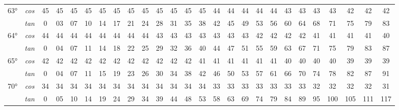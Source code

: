 \begin{tiny}
\begin{longtable}{c c |c |c |c |c |c |c |c |c |c |c |c |c |c |c |c |c |c |c |c |c |c |c |c |c}
		\multirow{2}{*}{63°}&\textit{cos}& 45& 45& 45& 45& 45& 45& 45& 45& 45& 45& 45& 45& 44& 44& 44& 44& 44& 43& 43& 43& 43& 42& 42& 42\\* \space&\textit{tan} & 0 & 03 & 07& 10& 14& 17& 21& 24& 28& 31& 35& 38& 42& 45& 49& 53& 56& 60& 64& 68& 71& 75& 79& 83\\\hline
		\multirow{2}{*}{64°}&\textit{cos}& 44& 44& 44& 44& 44& 44& 44& 44& 43& 43& 43& 43& 43& 43& 43& 42& 42& 42& 42& 41& 41& 41& 41& 40\\* \space&\textit{tan} & 0 & 04 & 07& 11& 14& 18& 22& 25& 29& 32& 36& 40& 44& 47& 51& 55& 59& 63& 67& 71& 75& 79& 83& 87\\\hline
		\multirow{2}{*}{65°}&\textit{cos}& 42& 42& 42& 42& 42& 42& 42& 42& 42& 42& 42& 41& 41& 41& 41& 41& 41& 40& 40& 40& 40& 39& 39& 39\\* \space&\textit{tan} & 0 & 04 & 07& 11& 15& 19& 23& 26& 30& 34& 38& 42& 46& 50& 53& 57& 61& 66& 70& 74& 78& 82& 87& 91\\\hline
		\multirow{2}{*}{70°}&\textit{cos}& 34& 34& 34& 34& 34& 34& 34& 34& 34& 34& 34& 34& 33& 33& 33& 33& 33& 33& 33& 32& 32& 32& 32& 31\\* \space&\textit{tan} & 0 & 05& 10& 14& 19& 24& 29& 34& 39& 44& 48& 53& 58& 63& 69& 74& 79& 84& 89& 95 & 100& 105& 111& 117\\\hline
\end{longtable}\end{tiny}

\newpage

